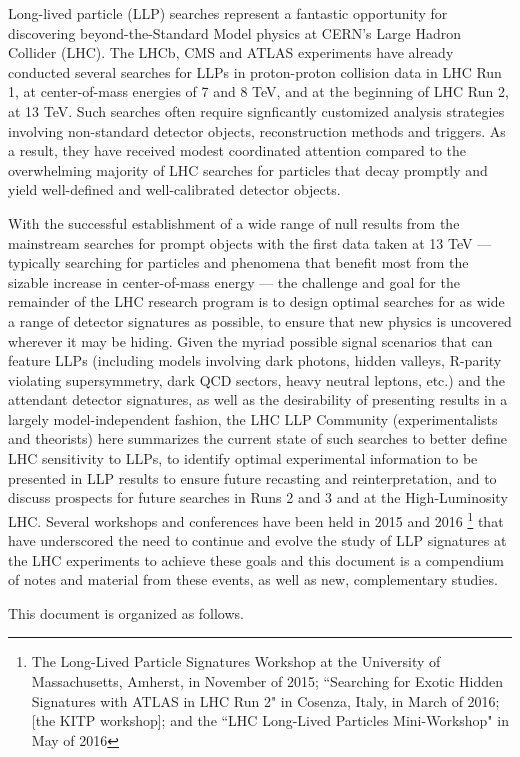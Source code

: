 Long-lived particle (LLP) searches represent a fantastic opportunity for discovering beyond-the-Standard Model physics at CERN's Large Hadron Collider (LHC).  The LHCb, CMS and ATLAS experiments have already conducted several searches for LLPs in proton-proton collision data in LHC Run 1, at center-of-mass energies of 7 and 8 TeV, and at the beginning of LHC Run 2, at 13 TeV.  Such searches often require signficantly customized analysis strategies involving non-standard detector objects, reconstruction methods and triggers.  As a result, they have received modest coordinated attention compared to the overwhelming majority of LHC searches for particles that decay promptly and yield well-defined and well-calibrated detector objects.

With the successful establishment of a wide range of null results from the mainstream searches for prompt objects with the first data taken at 13 TeV --- typically searching for particles and phenomena that benefit most from the sizable increase in center-of-mass energy --- the challenge and goal for the remainder of the LHC research program is to design optimal searches for as wide a range of detector signatures as possible, to ensure that new physics is uncovered wherever it may be hiding.  Given the myriad possible signal scenarios that can feature LLPs (including models involving dark photons, hidden valleys, R-parity violating supersymmetry, dark QCD sectors, heavy neutral leptons, etc.) and the attendant detector signatures, as well as the desirability of presenting results in a largely model-independent fashion, the LHC LLP Community (experimentalists and theorists) here summarizes the current state of such searches to better define LHC sensitivity to LLPs, to identify optimal experimental information to be presented in LLP results to ensure future recasting and reinterpretation, and to discuss prospects for future searches in Runs 2 and 3 and at the High-Luminosity LHC.  Several workshops and conferences have been held in 2015 and 2016 \footnote{The Long-Lived Particle Signatures Workshop at the University of Massachusetts, Amherst, in November of 2015; ``Searching for Exotic Hidden Signatures with ATLAS in LHC Run 2" in Cosenza, Italy, in March of 2016; [the KITP workshop]; and the ``LHC Long-Lived Particles Mini-Workshop" in May of 2016} that have underscored the need to continue and evolve the study of LLP signatures at the LHC experiments to achieve these goals and this document is a compendium of notes and material from these events, as well as new, complementary studies.

This document is organized as follows.